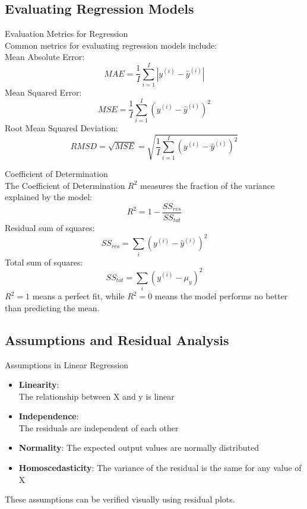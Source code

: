 \subsection{Evaluating Regression Models}


\begin{theorem}{Evaluation Metrics for Regression}\\
Common metrics for evaluating regression models include:\\
    Mean Absolute Error: 
    $$MAE = \frac{1}{I} \sum_{i=1}^{I} |y^{(i)}-\hat{y}^{(i)}|$$
    Mean Squared Error: 
    $$MSE = \frac{1}{I}\sum_{i=1}^{I}(y^{(i)}-\hat{y}^{(i)})^2$$
    Root Mean Squared Deviation: 
    $$RMSD = \sqrt{MSE} = \sqrt{\frac{1}{I}\sum_{i=1}^{I}(y^{(i)}-\hat{y}^{(i)})^2}$$
\end{theorem}

\begin{theorem}{Coefficient of Determination}\\
The Coefficient of Determination $R^2$ measures the fraction of the variance explained by the model:
\[R^2 = 1 - \frac{SS_{res}}{SS_{tot}}\]
Residual sum of squares:
$$SS_{res} = \sum_i (y^{(i)} - \hat{y}^{(i)})^2$$
Total sum of squares:
$$SS_{tot} = \sum_i (y^{(i)} - \mu_y)^2$$
$R^2 = 1$ means a perfect fit, while $R^2 = 0$ means the model performs no better than predicting the mean.
\end{theorem}

\multend

\subsection{Assumptions and Residual Analysis}


\begin{concept}{Assumptions in Linear Regression}
\begin{itemize}
    \item \textbf{Linearity}: \\The relationship between X and y is linear
    \item \textbf{Independence}: \\The residuals are independent of each other
    \item \textbf{Normality}: The expected output values are normally distributed
    \item \textbf{Homoscedasticity}: The variance of the residual is the same for any value of X
\end{itemize}
These assumptions can be verified visually using residual plots.
\end{concept}


